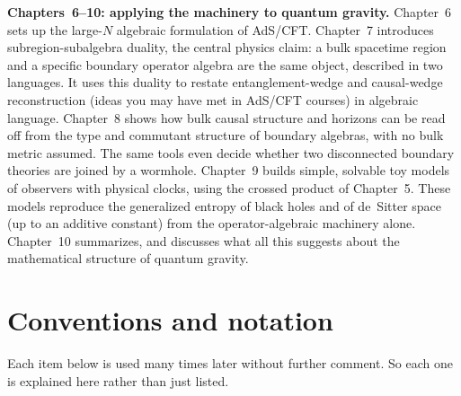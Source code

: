 \textbf{Chapters~6--10: applying the machinery to quantum gravity.} Chapter~6 sets up the large-$N$
algebraic formulation of AdS/CFT. Chapter~7 introduces subregion-subalgebra duality, the central physics
claim: a bulk spacetime region and a specific boundary operator algebra are the same object, described in two
languages. It uses this duality to restate entanglement-wedge and causal-wedge reconstruction (ideas you may
have met in AdS/CFT courses) in algebraic language. Chapter~8 shows how bulk causal structure and horizons can
be read off from the type and commutant structure of boundary algebras, with no bulk metric assumed. The same
tools even decide whether two disconnected boundary theories are joined by a wormhole. Chapter~9 builds
simple, solvable toy models of observers with physical clocks, using the crossed product of Chapter~5. These
models reproduce the generalized entropy of black holes and of de~Sitter space (up to an additive constant)
from the operator-algebraic machinery alone. Chapter~10 summarizes, and discusses what all this suggests
about the mathematical structure of quantum gravity.

\section{Conventions and notation}

Each item below is used many times later without further comment. So each one is explained here rather than
just listed.

